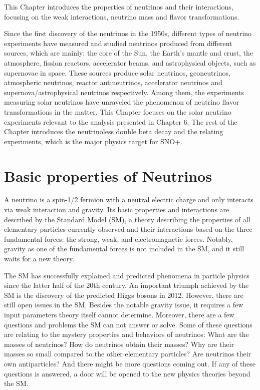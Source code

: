 This Chapter introduces the properties of neutrinos and their interactions, focusing on the weak interactions, neutrino mass and flavor transformations. 

Since the first discovery of the neutrinos in the 1950s, different types of neutrino experiments have measured and studied neutrinos produced from different sources, which are mainly: the core of the Sun, the Earth's mantle and crust, the atmosphere, fission reactors, accelerator beams, and astrophysical objects, such as supernovae in space. These sources produce solar neutrinos, geoneutrinos, atmospheric neutrinos, reactor antineutrinos, accelerator neutrinos and supernova/astrophysical neutrinos respectively. Among them, the experiments measuring solar neutrinos have unraveled the phenomenon of neutrino flavor transformations in the matter. This Chapter focuses on the solar neutrino experiments relevant to the analysis presented in Chapter 6. The rest of the Chapter introduces the neutrinoless double beta decay and the relating experiments, which is the major physics target for SNO+.

\section{Basic properties of Neutrinos}

A neutrino is a spin-1/2 fermion with a neutral electric charge and only interacts via weak interaction and gravity. Its basic properties and interactions are described by the Standard Model (SM), a theory describing the properties of all elementary particles currently observed and their interactions based on the three fundamental forces: the strong, weak, and electromagnetic forces. Notably, gravity as one of the fundamental forces is not included in the SM, and it still waits for a new theory. 

The SM has successfully explained and predicted phenomena in particle physics since the latter half of the 20th century. An important triumph achieved by the SM is the discovery of the predicted Higgs bosons in 2012. However, there are still open issues in the SM. Besides the notable gravity issue, it requires a few input parameters theory itself cannot determine. Moreover, there are a few questions and problems the SM can not answer or solve. Some of these questions are relating to the mystery properties and behaviors of neutrinos: What are the masses of neutrinos? How do neutrinos obtain their masses? Why are their masses so small compared to the other elementary particles? Are neutrinos their own antiparticles? And there might be more questions coming out. If any of these questions is answered, a door will be opened to the new physics theories beyond the SM.


